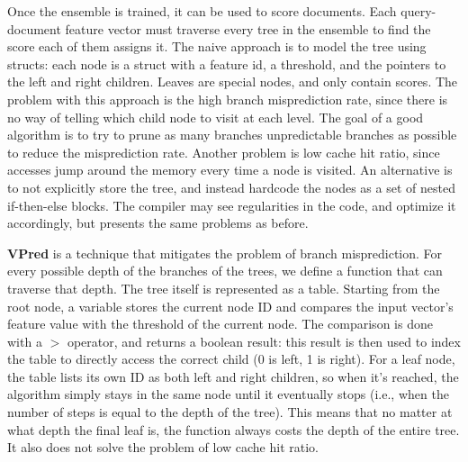 Once the ensemble is trained, it can be used to score documents. Each query-document feature vector must traverse every tree in the ensemble to find the score each of them assigns it. The naive approach is to model the tree using structs: each node is a struct with a feature id, a threshold, and the pointers to the left and right children. Leaves are special nodes, and only contain scores. The problem with this approach is the high branch misprediction rate, since there is no way of telling which child node to visit at each level. The goal of a good algorithm is to try to prune as many branches unpredictable branches as possible to reduce the misprediction rate. Another problem is low cache hit ratio, since accesses jump around the memory every time a node is visited. An alternative is to not explicitly store the tree, and instead hardcode the nodes as a set of nested if-then-else blocks. The compiler may see regularities in the code, and optimize it accordingly, but presents the same problems as before.

\textbf{VPred} is a technique that mitigates the problem of branch misprediction. For every possible depth of the branches of the trees, we define a function that can traverse that depth. The tree itself is represented as a table. Starting from the root node, a variable stores the current node ID and compares the input vector's feature value with the threshold of the current node. The comparison is done with a $>$ operator, and returns a boolean result: this result is then used to index the table to directly access the correct child (0 is left, 1 is right). For a leaf node, the table lists its own ID as both left and right children, so when it's reached, the algorithm simply stays in the same node until it eventually stops (i.e., when the number of steps is equal to the depth of the tree). This means that no matter at what depth the final leaf is, the function always costs the depth of the entire tree. It also does not solve the problem of low cache hit ratio.

